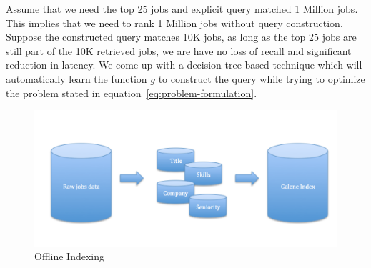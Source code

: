 \documentclass{sig-alternate-05-2015}
\begin{document}
Assume that we need the top 25 jobs and explicit query matched 1 Million jobs.
This implies that we need to rank 1 Million jobs without query construction.
Suppose the constructed query matches 10K jobs, as long as the top 25 jobs are
still part of the 10K retrieved jobs, we are have no loss of recall and
significant reduction in latency.
We come up with a decision tree based technique which will automatically learn
the function $g$ to construct the query while trying to optimize the problem
stated in equation~\ref{eq:problem-formulation}.




\begin{figure}
\includegraphics[width=\linewidth,height=\textheight,keepaspectratio]{offline-indexing.png}
\caption{Offline Indexing}
\label{fig:offline-indexing}
\end{figure}











%

%
%
%
%
\end{document}

